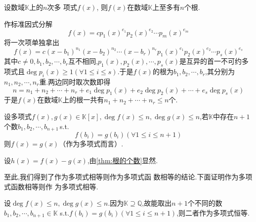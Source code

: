 \begin{formal}
\begin{theorem}[根的个数]\label{thm:根的个数}
    设数域$\mathbb{K}$上的$n$次多
    项式$f\left(x\right)$,
    则$f\left(x\right)$在数域$
    \mathbb{K}$上至多有$n$个根.
\end{theorem}
\begin{Proof}
作标准因式分解
\[
f\left(x\right)=cp_1\left(x\right)^{e_1}p_2\left(x\right)^{e_2}\cdots p_m\left(x\right)^{e_m}
\]
将一次项单独拿出
\[
f\left(x\right)=c\left(x-b_1\right)^{n_1}\left(x-b_2\right)^{n_2}\cdots\left(x-b_r\right)^{n_r}p_1\left(x\right)^{e_1}p_2\left(x\right)^{e_2}\cdots p_s\left(x\right)^{e_s}
\]
其中$c\neq 0,b_1,b_2,\cdots,b_r$互不相同,$p_1\left(x\right),p_2\left(x\right),\cdots,p_s\left(x\right)$是互异的首一不可约多项式且$\deg p_i\left(x\right)\geqslant 1\left(\forall 1\leqslant i\leqslant 
s\right)$.于是$f\left(x\right)$的根为$b_1,b_2,\cdots,b_r$,其分别为$n_1,n_2,\cdots,n_r$重.两边同时取次数即得
\[
n=n_1+n_2+\cdots+n_r+e_1\deg p_1\left(x\right)+e_2\deg p_2\left(x\right)+\cdots+e_s\deg p_s\left(x\right)
\]于是$f\left(x\right)$在数域$\mathbb{K}$上的根一共有$n_1+n_2+\cdots+n_r\leqslant n$个.
\end{Proof}
\end{formal}
\begin{green}
\begin{lemma}[多项式相同]\label{lem:多项式相同}
    设多项式$f\left(x\right),g\left(x\right)\in\mathbb{K}\left[x\right],\deg f\left(x\right)\leqslant n,\deg g\left(x\right)\leqslant n$,若$\mathbb{K}$中存在$n+1$个数$b_1,b_2,\cdots,b_{n+1}$\,\textup{s.t.}
    \[
    f\left(b_i\right)=g\left(b_i\right)\left(\forall 1\leqslant i\leqslant n+1\right)
    \]
    则$f\left(x\right)=g\left(x\right)$（作为多项式而言）.
\end{lemma}
\begin{Proof}
设$h\left(x\right)=f\left(x\right)-g\left(x\right)$,由\cref{thm:根的个数}显然.
\end{Proof}
\end{green}
至此,我们得到了作为多项式相等则作为多项式函
数相等的结论.下面证明作为多项式函数相等则作
为多项式相等.
\begin{brown}
\begin{Proof}
设$\deg f\left(x\right)\leqslant n,\deg g\left(x\right)\leqslant n.$因为$\mathbb{K}\supseteq \mathbb{Q}$,故能取出$n+1$个不同的数
$b_1,b_2,\cdots,b_{n+1}\in\mathbb{K}$
\textup{s.t.}$f\left(b_i\right)=g\left(b_i\right)\left(\forall 1\leqslant i\leqslant n+1
\right)$,则二者作为多项式恒等.
\end{Proof}
\end{brown}
